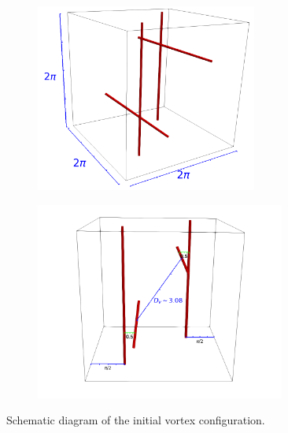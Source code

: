\documentclass[%
superscriptaddress,
 amsmath,amssymb,
prl,
prb,
]{revtex4-2}
\begin{document}
\begin{figure}
	\centering
	\begin{subfigure}[b]{0.49\textwidth}
		\centering
		\includegraphics[width=0.8\textwidth]{schematic.png}
	\end{subfigure}
	\begin{subfigure}[b]{0.49\textwidth}
		\centering
		\includegraphics[width=0.9\textwidth]{schematic-2.png}
	\end{subfigure}
	\caption{Schematic diagram of the initial vortex configuration.}
	\label{fig:schematic}
\end{figure}
\end{document}
